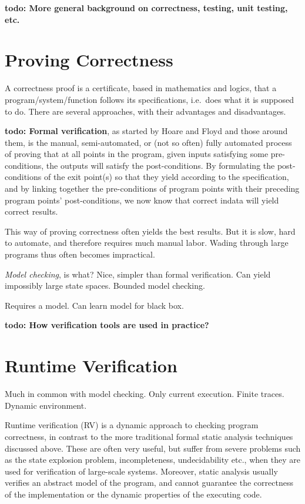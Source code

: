\documentclass[a4paper,11pt]{kth-mag}
\newcommand{\todo}[1]{\textbf{todo: #1}}
\begin{document}
\todo{More general background on correctness, testing, unit testing, etc.}

\section{Proving Correctness}

A correctness proof is a certificate, based in mathematics and logics, that a
program/system/function follows its specifications, i.e.\ does what it is
supposed to do. There are several approaches, with their advantages and
disadvantages.

\todo{Formal verification}, as started by Hoare \cite{hoare69} and Floyd
\cite{floyd67} and those around them, is the manual, semi-automated, or (not so
often) fully automated process of proving that at all points in the program,
given inputs satisfying some pre-conditions, the outputs will satisfy the
post-conditions. By formulating the post-conditions of the exit point(s) so
that they yield according to the specification, and by linking together the
pre-conditions of program points with their preceding program points'
post-conditions, we now know that correct indata will yield correct results.

This way of proving correctness often yields the best results. But it is slow,
hard to automate, and therefore requires much manual labor. Wading through
large programs thus often becomes impractical.

\textit{Model checking}, is what?  Nice, simpler than formal verification. Can
yield impossibly large state spaces. Bounded model checking.

Requires a model. Can learn model for black box.

\todo{How verification tools are used in practice?}

\section{Runtime Verification}\label{section-rv}

Much in common with model checking. Only current execution. Finite traces.
Dynamic environment.

Runtime verification (RV) is a dynamic approach to checking program
correctness, in contrast to the more traditional formal static analysis
techniques discussed above. These are often very useful, but suffer from severe
problems such as the state explosion problem, incompleteness, undecidability
etc., when they are used for verification of large-scale systems.  Moreover,
static analysis usually verifies an abstract model of the program, and cannot
guarantee the correctness of the implementation or the dynamic properties of
the executing code.
\end{document}
